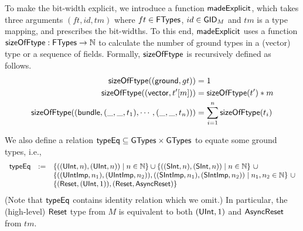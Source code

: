 To make the bit-width %
explicit, we introduce a function ${\sf madeExplicit}$, which takes three arguments $(ft, id, tm)$ where $ft \in {\sf FTypes}$, $id \in \mathsf{GID}_M$ and $tm$ is a type mapping, and %
prescribes the bit-widths. %
%
%
To this end, ${\sf madeExplicit}$ uses a function ${\sf sizeOfFtype}:{\sf FTypes}\rightarrow \mathbb{N}$ to calculate the number of ground types in a (vector) type or a sequence of fields. %
Formally, ${\sf sizeOfFtype}$ is recursively defined as follows.
%
\begin{align*}
   	{\sf sizeOfFtype} (({\sf ground}, gt)) & =1\\
	{\sf sizeOfFtype} (({\sf vector}, t'[m])) & =  {\sf sizeOfFtype}(t')*m\\
	{\sf sizeOfFtype} (({\sf bundle}, (\_, \_, t_1), \cdots, (\_, \_, t_n))) & = \sum_{i=1}^n{\sf sizeOfFtype}(t_i)
\end{align*}

We also define a relation ${\sf typeEq}\subseteq {\sf GTypes}\times {\sf GTypes}$ to equate some ground types, i.e., %
%
\[
\begin{array}{l c l}
\typeeq & := & \{((\uint, n), (\uint, n)) \mid n  \in \Nat \} \cup \{((\sint, n), (\sint, n)) \mid n  \in \Nat \}\ \cup \\
&& \{((\uintimp, n_1), (\uintimp, n_2)), ((\sintimp, n_1), (\sintimp, n_2)) \mid n_1, n_2 \in \Nat\}\ \cup  \\
%		
&&  %
  \{(\reset, (\uint, 1)), (\reset,\asyncreset)\}
\end{array}
\]
(Note that ${\sf typeEq}$ contains identity relation which we omit.)
%
In particular, the (high-level) ${\sf Reset}$ type from $M$ is equivalent to both $({\sf UInt}, 1)$ and ${\sf AsyncReset}$ from $tm$.
%

